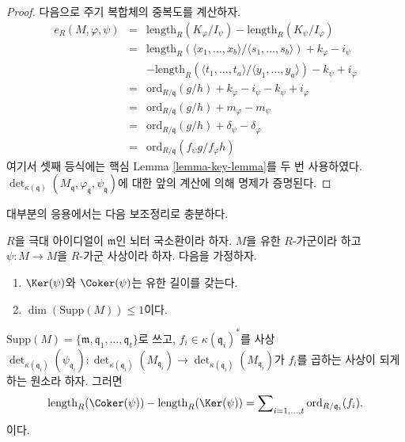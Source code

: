 \begin{proof}
\medskip\noindent
다음으로 주기 복합체의 중복도를 계산하자.
\begin{eqnarray*}
e_R(M, \varphi, \psi) & = &
\text{length}_R(K_\varphi/I_\psi) - \text{length}_R(K_\psi/I_\varphi) \\
& = &
\text{length}_R(
\langle x_1, \ldots, x_b\rangle/
\langle s_1, \ldots, s_b\rangle)
+ k_\varphi - i_\psi \\
& & -
\text{length}_R(
\langle t_1, \ldots, t_a\rangle/
\langle y_1, \ldots, y_a\rangle)
- k_\psi + i_\varphi \\
& = &
\text{ord}_{R/\mathfrak q}(g/h) + k_\varphi - i_\psi - k_\psi + i_\varphi \\
& = &
\text{ord}_{R/\mathfrak q}(g/h) + m_\varphi - m_\psi \\
& = &
\text{ord}_{R/\mathfrak q}(g/h) + \delta_\psi - \delta_\varphi \\
& = &
\text{ord}_{R/\mathfrak q}(f_\psi g/f_\varphi h)
\end{eqnarray*}
여기서 셋째 등식에는 핵심 Lemma \ref{lemma-key-lemma}를 두 번
사용하였다.
$\det_{\kappa(\mathfrak q)}
(M_{\mathfrak q}, \varphi_{\mathfrak q}, \psi_{\mathfrak q})$에 대한
앞의 계산에 의해 명제가 증명된다.
\end{proof}

\noindent
대부분의 응용에서는 다음 보조정리로 충분하다.

\begin{lemma}
\label{lemma-application-herbrand-quotient}
$R$을 극대 아이디얼이 $\mathfrak m$인 뇌터 국소환이라 하자.
$M$을 유한 $R$-가군이라 하고 $\psi : M \to M$을 $R$-가군 사상이라
하자. 다음을 가정하자.
\begin{enumerate}
\item $\Ker(\psi)$와 $\Coker(\psi)$는 유한 길이를 갖는다.
\item $\dim(\text{Supp}(M)) \leq 1$이다.
\end{enumerate}
$\text{Supp}(M) = \{\mathfrak m, \mathfrak q_1, \ldots, \mathfrak q_t\}$로
쓰고, $f_i \in \kappa(\mathfrak q_i)^*$를 사상
$\det_{\kappa(\mathfrak q_i)}(\psi_{\mathfrak q_i}) :
\det_{\kappa(\mathfrak q_i)}(M_{\mathfrak q_i})
\to \det_{\kappa(\mathfrak q_i)}(M_{\mathfrak q_i})$가 $f_i$를 곱하는
사상이 되게 하는 원소라 하자. 그러면
$$
\text{length}_R(\Coker(\psi))
-
\text{length}_R(\Ker(\psi))
=
\sum\nolimits_{i = 1, \ldots, t}
\text{ord}_{R/\mathfrak q_i}(f_i).
$$
이다.
\end{lemma}

